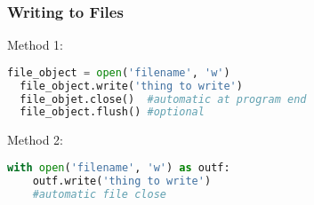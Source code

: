 \documentclass{beamer}
\begin{document}
%
%
\begin{frame}[fragile]
  \frametitle{Writing to Files}
  Method 1:
  \begin{lstlisting}[language=Python, autogobble]
  file_object = open('filename', 'w')
  file_object.write('thing to write')
  file_objet.close()  #automatic at program end
  file_object.flush() #optional
  \end{lstlisting}
  \vfill
  Method 2:
  \begin{lstlisting}[language=Python, autogobble]
  with open('filename', 'w') as outf:
    outf.write('thing to write')
    #automatic file close
  \end{lstlisting}
\end{frame}
\end{document}
